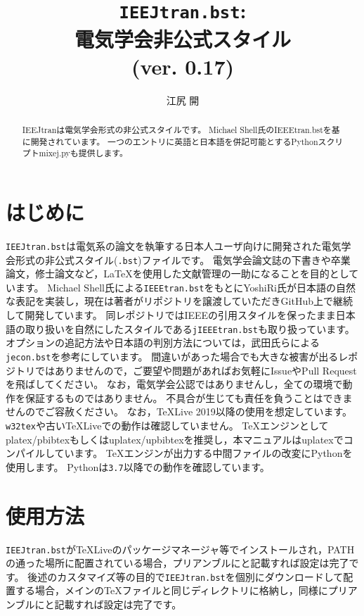 \documentclass[11pt, a4paper, dvipdfmx, uplatex]{jsarticle}
\title{\texttt{IEEJtran.bst}:\\電気学会非公式\BibTeX スタイル\\(ver. 0.17)}
\author{江尻 開}
\begin{document}
\maketitle

\begin{abstract}
IEEJtranは電気学会形式の非公式\BibTeX スタイルです。
Michael Shell氏のIEEEtran.bstを基に開発されています。
一つのエントリに英語と日本語を併記可能とするPythonスクリプトmixej.pyも提供します。
\end{abstract}


\section{はじめに}

\texttt{IEEJtran.bst}は電気系の論文を執筆する日本人ユーザ向けに開発された電気学会形式の非公式\BibTeX スタイル(\texttt{.bst})ファイルです。
電気学会論文誌の下書きや卒業論文，修士論文など，\LaTeX を使用した文献管理の一助になることを目的としています。
Michael Shell氏による\texttt{IEEEtran.bst}\cite{IEEEtran}をもとにYoshiRi氏が日本語の自然な表記を実装し，現在は著者がリポジトリを譲渡していただきGitHub上\cite{jIEEEtran}で継続して開発しています。
同レポジトリではIEEEの引用スタイルを保ったまま日本語の取り扱いを自然にした\BibTeX スタイルである\texttt{jIEEEtran.bst}も取り扱っています。
オプションの追記方法や日本語の判別方法については，武田氏らによる\texttt{jecon.bst}\cite{jeconbst}を参考にしています。
間違いがあった場合でも大きな被害が出るレポジトリではありませんので，ご要望や問題があればお気軽にIssueやPull Requestを飛ばしてください。
なお，電気学会公認ではありませんし，全ての環境で動作を保証するものではありません。
不具合が生じても責任を負うことはできませんのでご容赦ください。
なお，\TeX Live 2019以降の使用を想定しています。
\texttt{w32tex}や古い\TeX Liveでの動作は確認していません。
\TeX エンジンとしてplatex/pbibtexもしくはuplatex/upbibtexを推奨し，本マニュアルはuplatexでコンパイルしています。
\TeX エンジンが出力する中間ファイルの改変にPythonを使用します。
Pythonは\texttt{3.7}以降での動作を確認しています。


\section{使用方法}

\texttt{IEEJtran.bst}が\TeX Liveのパッケージマネージャ等でインストールされ，PATHの通った場所に配置されている場合，プリアンブルに\texttt{\string{}}と記載すれば設定は完了です。
後述のカスタマイズ等の目的で\texttt{IEEJtran.bst}を個別にダウンロードして配置する場合，メインの\TeX ファイルと同じディレクトリに格納し，同様にプリアンブルに\texttt{\string{}}と記載すれば設定は完了です。
\end{document}
